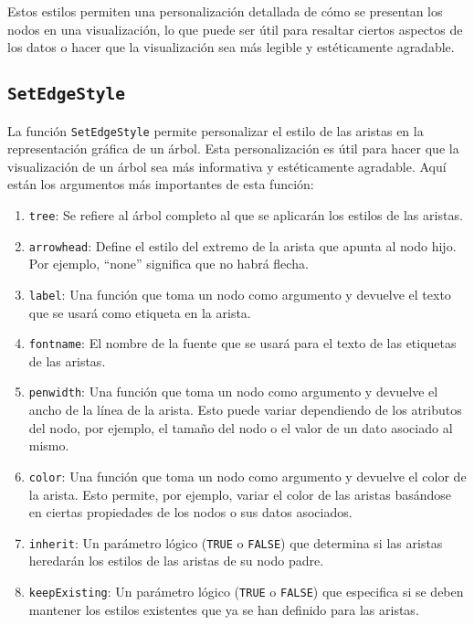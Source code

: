 \documentclass[12pt]{report}\usepackage[]{graphicx}\usepackage[dvipsnames]{xcolor}
\begin{document}
			 	Estos estilos permiten una personalización detallada de cómo se presentan los nodos en una visualización, lo que puede ser útil para resaltar ciertos aspectos de los datos o hacer que la visualización sea más legible y estéticamente agradable.
			 	
		 	\subsection{\texttt{SetEdgeStyle}}\label{subsec:edge_style}
			 	
			 	La función \texttt{SetEdgeStyle} permite personalizar el estilo de las aristas en la representación gráfica de un árbol. Esta personalización es útil para hacer que la visualización de un árbol sea más informativa y estéticamente agradable. Aquí están los argumentos más importantes de esta función:
			 	
			 	\begin{enumerate}[label = \textbf{\arabic*.}]
			 		\item \texttt{tree}: Se refiere al árbol completo al que se aplicarán los estilos de las aristas.
			 		
			 		\item \texttt{arrowhead}: Define el estilo del extremo de la arista que apunta al nodo hijo. Por ejemplo, ``none'' significa que no habrá flecha.
			 		
			 		\item \texttt{label}: Una función que toma un nodo como argumento y devuelve el texto que se usará como etiqueta en la arista.
			 		
			 		\item \texttt{fontname}: El nombre de la fuente que se usará para el texto de las etiquetas de las aristas.
			 		
			 		\item \texttt{penwidth}: Una función que toma un nodo como argumento y devuelve el ancho de la línea de la arista. Esto puede variar dependiendo de los atributos del nodo, por ejemplo, el tamaño del nodo o el valor de un dato asociado al mismo.
			 		
			 		\item \texttt{color}: Una función que toma un nodo como argumento y devuelve el color de la arista. Esto permite, por ejemplo, variar el color de las aristas basándose en ciertas propiedades de los nodos o sus datos asociados.
			 		
			 		\item \texttt{inherit}: Un parámetro lógico (\texttt{TRUE} o \texttt{FALSE}) que determina si las aristas heredarán los estilos de las aristas de su nodo padre.
			 		
			 		\item \texttt{keepExisting}: Un parámetro lógico (\texttt{TRUE} o \texttt{FALSE}) que especifica si se deben mantener los estilos existentes que ya se han definido para las aristas.
			 	\end{enumerate}
			 	
\end{document}
